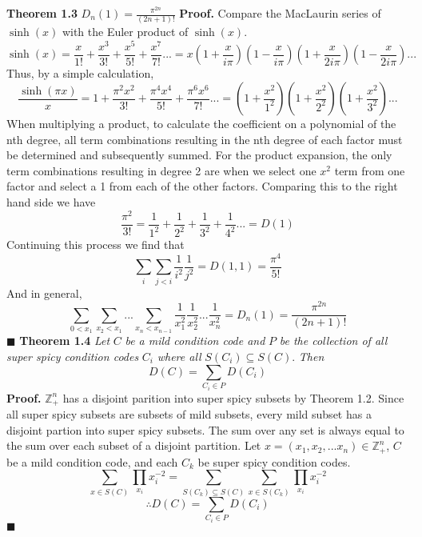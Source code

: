 \documentclass[12pt]{article}
\begin{document}
\textbf{Theorem 1.3} \(D_n(1)=\frac{\pi^{2n}}{(2n+1)!}\)
\newline
\textbf{Proof.}\newline
Compare the MacLaurin series of \(\sinh(x)\) with the Euler product of \(\sinh(x)\).
\[\sinh(x)=\frac{x}{1!} + \frac{x^3}{3!} + \frac{x^5}{5!} + \frac{x^7}{7!}... =x\left(1+\frac{x}{i\pi}\right)\left(1-\frac{x}{i\pi}\right)\left(1+\frac{x}{2i\pi}\right)\left(1-\frac{x}{2i\pi}\right)...\]
Thus, by a simple calculation,
\[\frac{\sinh(\pi x)}{x}=1+\frac{\pi^2x^2}{3!}+\frac{\pi^4x^4}{5!}+\frac{\pi^6x^6}{7!}...=\left(1+\frac{x^2}{1^2}\right)\left(1+\frac{x^2}{2^2}\right)\left(1+\frac{x^2}{3^2}\right)...\]
\newline
When multiplying a product, to calculate the coefficient on a polynomial of the nth degree, all term combinations resulting in the nth degree of each factor must be determined and subsequently summed. \newline
\newline
For the product expansion, the only term combinations resulting in degree 2 are when we select one \(x^2\) term from one factor and select a 1 from each of the other factors. Comparing this to the right hand side we have
\[\frac{\pi^2}{3!}=\frac{1}{1^2}+\frac{1}{2^2}+\frac{1}{3^2}+\frac{1}{4^2}...=D(1)\]
\newline
\newline
Continuing this process we find that
\[\sum_i\sum_{j<i}\frac{1}{i^2}\frac{1}{j^2}=D(1,1)=\frac{\pi^4}{5!}\]
And in general,
\[\sum_{0<x_1}\sum_{x_2<x_1}...\sum_{x_n<x_{n-1}}\frac{1}{x_1^2}\frac{1}{x_2^2}...\frac{1}{x_n^2}=D_n(1)=\frac{\pi^{2n}}{(2n+1)!}\]
\(\blacksquare\)
\newline
\newline
\textbf{Theorem 1.4} \textit{Let } \(C\) \textit{ be a mild condition code and } \(P\) \textit{ be the collection of all super spicy condition codes } \(C_i\) \textit{ where all }\(S(C_i)\subseteq S(C)\).\textit{ Then } \[D(C)=\sum_{C_i\in P}D(C_i)\]
\textbf{Proof. }
\newline
\(\mathbb{Z}_+^n\) has a disjoint parition into super spicy subsets by Theorem 1.2. \newline
Since all super spicy subsets are subsets of mild subsets, every mild subset has a disjoint partion into super spicy subsets.
\newline
\newline
The sum over any set is always equal to the sum over each subset of a disjoint partition.
\newline
Let \(x = (x_1,x_2,...x_n)\in \mathbb{Z}_+^n\), \(C\) be a mild condition code, and each \(C_k\) be super spicy condition codes.
\[\sum_{x \in S(C)}\prod_{x_i}x_i^{-2}=\sum_{S(C_k)\subseteq S(C)}\sum_{x \in S(C_k)}\prod_{x_i}x_i^{-2}\]
\[\therefore D(C)=\sum_{C_i\in P}D(C_i)\]
\(\blacksquare\) \newline
\newpage
\end{document}
